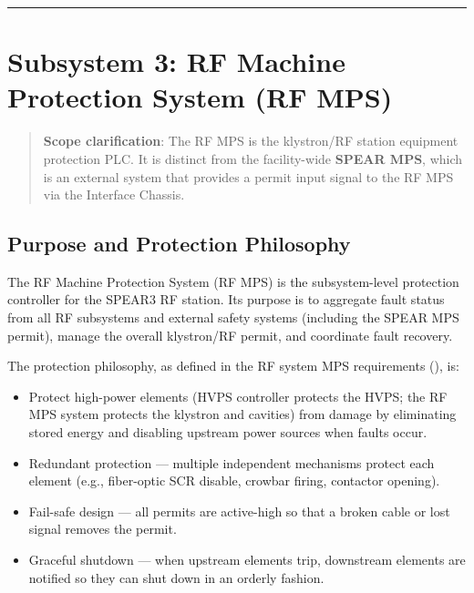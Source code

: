 \begin{center}\rule{0.5\linewidth}{0.5pt}\end{center}

\section{Subsystem 3: RF Machine Protection System (RF MPS)}\label{subsystem-3-rf-machine-protection-system-rf-mps}

\begin{quote}
\textbf{Scope clarification}: The RF MPS is the klystron/RF station equipment protection PLC. It is distinct from the facility-wide \textbf{SPEAR MPS}, which is an external system that provides a permit input signal to the RF MPS via the Interface Chassis.
\end{quote}

\subsection{Purpose and Protection Philosophy}\label{purpose-and-protection-philosophy}

The RF Machine Protection System (RF MPS) is the subsystem-level protection controller for the SPEAR3 RF station. Its purpose is to aggregate fault status from all RF subsystems and external safety systems (including the SPEAR MPS permit), manage the overall klystron/RF permit, and coordinate fault recovery.

The protection philosophy, as defined in the RF system MPS requirements (), is:

\begin{itemize}
\tightlist
\item
  Protect high-power elements (HVPS controller protects the HVPS; the RF MPS system protects the klystron and cavities) from damage by eliminating stored energy and disabling upstream power sources when faults occur.
\item
  Redundant protection --- multiple independent mechanisms protect each element (e.g., fiber-optic SCR disable, crowbar firing, contactor opening).
\item
  Fail-safe design --- all permits are active-high so that a broken cable or lost signal removes the permit.
\item
  Graceful shutdown --- when upstream elements trip, downstream elements are notified so they can shut down in an orderly fashion.
\end{itemize}

